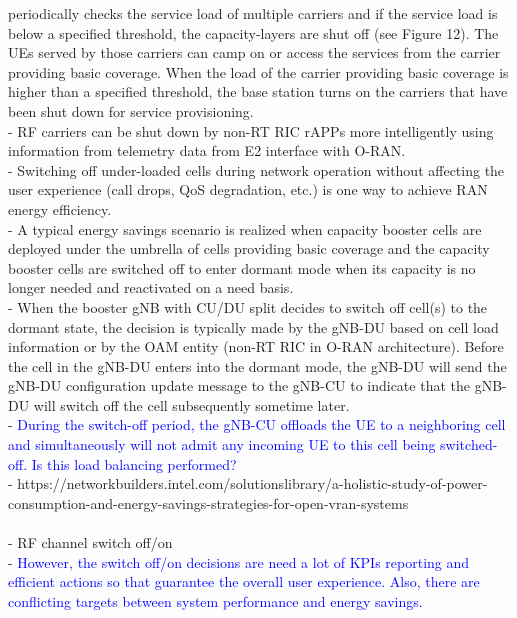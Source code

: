 \documentclass[conference]{IEEEtran}
\begin{document}
periodically checks the service load of multiple carriers and if the service load is below a specified threshold, the capacity-layers are shut off (see Figure 12). The UEs served by those carriers can camp on or access the services from the carrier providing basic coverage. When the load of the carrier providing basic coverage is higher than a specified threshold, the base station turns on the carriers that have been shut down for service provisioning. \\
- RF carriers can be shut down by non-RT RIC rAPPs more intelligently using information from telemetry data from E2 interface with O-RAN.\\
- Switching off under-loaded cells during network operation without affecting the user experience (call drops, QoS degradation, etc.) is one way to achieve RAN energy efficiency. \\
- A typical energy savings scenario is realized when capacity booster cells are deployed under the umbrella of cells providing basic coverage and the capacity booster cells are switched off to enter dormant mode when its capacity is no longer needed and reactivated on a need basis. \\
- When the booster gNB with CU/DU split decides to switch off cell(s) to the dormant state, the decision is typically made by the gNB-DU based on cell load information or by the OAM entity (non-RT RIC in O-RAN architecture). Before the cell in the gNB-DU enters into the dormant mode, the gNB-DU will send the gNB-DU configuration update message to the gNB-CU to indicate that the gNB-DU will switch off the cell subsequently sometime later. \\ 
- \textcolor{blue}{During the switch-off period, the gNB-CU offloads the UE to a neighboring cell and simultaneously will not admit any incoming UE to this cell being switched-off. Is this load balancing performed?}\\
- https://networkbuilders.intel.com/solutionslibrary/a-holistic-study-of-power-consumption-and-energy-savings-strategies-for-open-vran-systems \\ 
\\
- RF channel switch off/on \\
- \textcolor{blue}{However, the switch off/on decisions are need a lot of KPIs reporting and efficient actions so that guarantee the overall user experience. Also, there are conflicting targets between system performance and energy savings.} \\
\\
\end{document}
